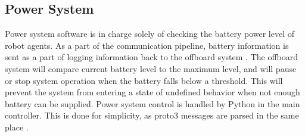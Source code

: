 
\subsection{Power System}
\label{sec:software_power}
Power system software is in charge solely of checking the battery power level of robot agents. As a part of the communication pipeline, battery information is sent as a part of logging information back to the offboard system . The offboard system will compare current battery level to the maximum level, and will pause or stop system operation when the battery falls below a threshold. This will prevent the system from entering a state of undefined behavior when not enough battery can be supplied. Power system control is handled by Python \cite{python27} in the main controller. This is done for simplicity, as proto3 messages are parsed in the same place .